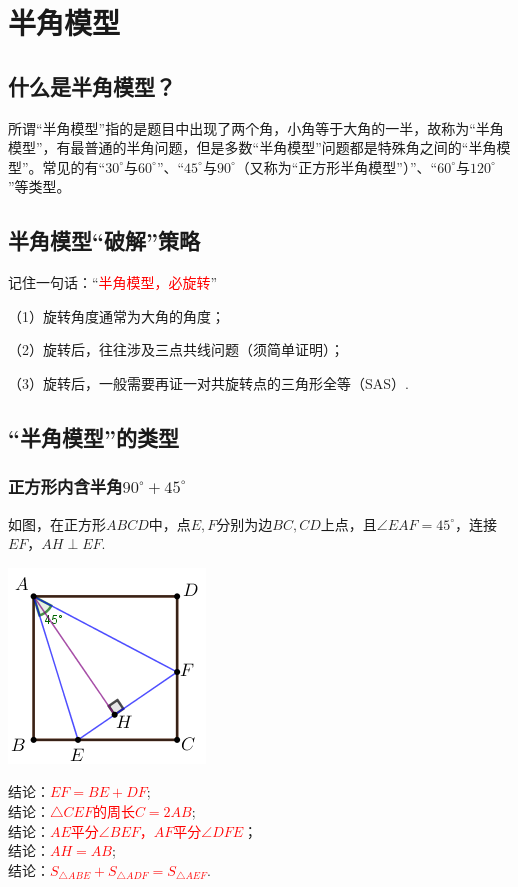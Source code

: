 \section{半角模型}
\subsection{什么是半角模型？}
所谓“半角模型”指的是题目中出现了两个角，小角等于大角的一半，故称为“半角模型”，有最普通的半角问题，但是多数“半角模型”问题都是特殊角之间的“半角模型”。常见的有“$30^\circ$与$60^\circ$”、“$45^\circ$与$90^\circ$（又称为“正方形半角模型”）”、“$60^\circ$与$120^\circ$”等类型。
\subsection{半角模型“破解”策略}
记住一句话：“\textcolor{red}{半角模型，必旋转}”
\begin{vuyi}

\kaishu （1）旋转角度通常为大角的角度；

（2）旋转后，往往涉及三点共线问题（须简单证明）；

（3）旋转后，一般需要再证一对共旋转点的三角形全等（SAS）.
\end{vuyi}
\subsection{“半角模型”的类型}
\subsubsection{正方形内含半角$90^\circ +45^\circ$}


如图，在正方形$ABCD$中，点$E,F$分别为边$BC,CD$上点，且$\angle EAF=45^\circ$，连接$EF$，$AH\perp EF$.
\begin{minipage}{0.3\textwidth}
	\includegraphics[scale=0.8]{figure/banjiao08}
\end{minipage}
\begin{minipage}{0.4\textwidth}
	结论：\textcolor{red}{$EF=BE+DF$};\\
	结论：\textcolor{red}{$\triangle CEF$的周长$C=2AB$};\\
	结论：\textcolor{red}{$AE$平分$\angle BEF$，$AF$平分$\angle DFE$}；\\
	结论：\textcolor{red}{$AH=AB$};\\
	结论：\textcolor{red}{$S_{\triangle ABE}+S_{\triangle ADF}=S_{\triangle AEF}$}.
\end{minipage}


